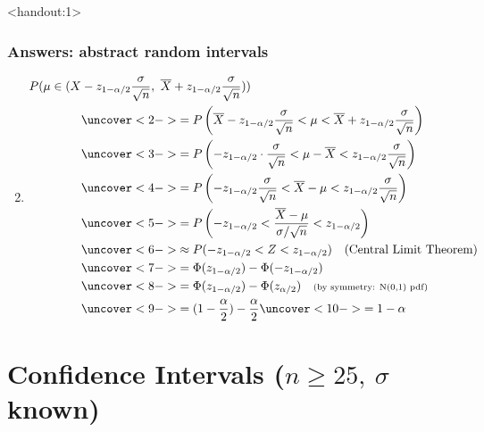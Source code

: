 \documentclass[handout]{beamer}\usepackage[]{graphicx}\usepackage[]{color}
\newcommand{\answers}{1}
\providecommand{\ov}[1]{\overline{#1}}
\numberwithin{equation}{section}
\begin{document}
\begin{frame}<handout:\answers>
\frametitle{Answers: abstract random intervals}
\begin{enumerate}
\setcounter{enumi}{1}
\item  \scriptsize
\begin{align*}
P(\mu \in (X &- z_{1 - \alpha/2} \frac{\sigma}{\sqrt{n}}, \ \ov{X} + z_{1 - \alpha/2} \frac{\sigma}{\sqrt{n}})) \\
&\uncover<2->{= P \left (\ov{X} - z_{1 - \alpha/2} \frac{\sigma}{\sqrt{n}} < \mu <  \ov{X} + z_{1 - \alpha/2} \frac{\sigma}{\sqrt{n}} \right)} \\
&\uncover<3->{= P \left ( - z_{1 - \alpha/2} \cdot \frac{\sigma}{\sqrt{n}} < \mu - \ov{X} <   z_{1 - \alpha/2} \frac{\sigma}{\sqrt{n}} \right)} \\
&\uncover<4->{= P\left ( - z_{1 - \alpha/2} \frac{\sigma}{\sqrt{n}} < \ov{X} - \mu <   z_{1 - \alpha/2} \frac{\sigma}{\sqrt{n}} \right)} \\
&\uncover<5->{= P \left ( - z_{1 - \alpha/2} < \frac{\ov{X}-\mu}{\sigma/\sqrt{n}} <   z_{1 - \alpha/2} \right )} \\
&\uncover<6->{\approx P( - z_{1 - \alpha/2} < Z <   z_{1 - \alpha/2}) \quad \text{(Central Limit Theorem)}}\\
&\uncover<7->{= \Phi(z_{1 - \alpha/2}) - \Phi(-z_{1-\alpha/2})} \\
&\uncover<8->{= \Phi(z_{1 - \alpha/2}) - \Phi(z_{\alpha/2}) \quad \text{\scriptsize(by symmetry: N(0,1) pdf)}} \\
&\uncover<9->{= (1 - \frac{\alpha}{2}) - \frac{\alpha}{2}} \uncover<10->{= 1 - \alpha} \\
\end{align*}
\end{enumerate}
\end{frame}






\section{Confidence Intervals ($n \ge 25, \ \sigma$ known)}
\end{document}
